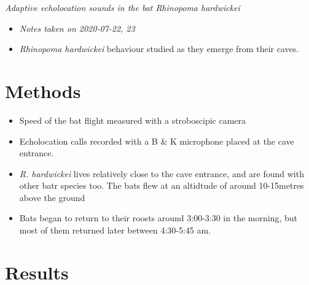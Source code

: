 \documentclass[
]{book}
\providecommand{\tightlist}{%
  \setlength{\itemsep}{0pt}\setlength{\parskip}{0pt}}
\begin{document}
\emph{Adaptive echolocation sounds in the bat Rhinopoma hardwickei} \citep{habersetzer1981adaptive}

\begin{itemize}
\item
  \emph{Notes taken on 2020-07-22, 23}
\item
  \emph{Rhinopoma hardwickei} behaviour studied as they emerge from their caves.
\end{itemize}

\hypertarget{methods}{%
\section{Methods}\label{methods}}

\begin{itemize}
\tightlist
\item
  Speed of the bat flight measured with a stroboscipic camera
\item
  Echolocation calls recorded with a B \& K microphone placed at the cave entrance.
\item
  \emph{R. hardwickei} lives relatively close to the cave entrance, and are found with other batr species too. The bats flew at an altidtude of around 10-15metres above the ground
\item
  Bats began to return to their roosts around 3:00-3:30 in the morning, but most of them returned later between 4:30-5:45 am.
\end{itemize}

\hypertarget{results}{%
\section{Results}\label{results}}
\end{document}
